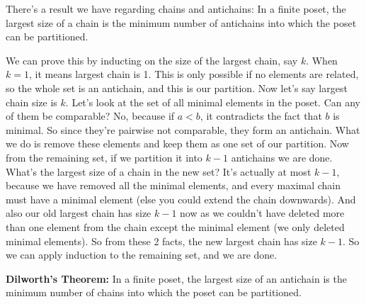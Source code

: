 \documentclass[a4paper,10pt]{article}
\theoremstyle{definition} %
\begin{document}
    There's a result we have regarding chains and antichains: In a finite poset, the largest size of a chain is the minimum number of antichains into which 
    the poset can be partitioned.

    We can prove this by inducting on the size of the largest chain, say $k$. When $k=1$, it means largest chain is 1. This is only possible if no elements are 
    related, so the whole set is an antichain, and this is our partition. Now let's say largest chain size is $k$. Let's look at the set of all minimal elements 
    in the poset. Can any of them be comparable? No, because if $a < b$, it contradicts the fact that $b$ is minimal. So since they're pairwise not comparable, they
    form an antichain. What we do is remove these elements and keep them as one set of our partition. Now from the remaining set, if we partition it into $k-1$ antichains
    we are done. What's the largest size of a chain in the new set? It's actually at most $k-1$, because we have removed all the minimal elements, and every maximal 
    chain must have a minimal element (else you could extend the chain downwards). And also our old largest chain has size $k-1$ now as we couldn't have deleted more than 
    one element from the chain except the minimal element (we only deleted minimal elements). So from these 2 facts, the new largest chain has size $k-1$. So we can apply 
    induction to the remaining set, and we are done.
    
    \textbf{Dilworth's Theorem: }In a finite poset, the largest size of an antichain is the minimum number of chains into which the poset can be partitioned.
\end{document}
